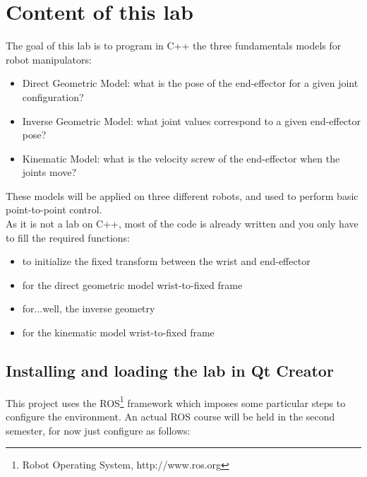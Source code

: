 \documentclass{ecnreport}
\begin{document}
  
  
  \section{Content of this lab}
  
  The goal of this lab is to program in C++ the three fundamentals models for robot manipulators:
  \begin{itemize}
    \item Direct Geometric Model: what is the pose of the end-effector for a given joint configuration?
    \item Inverse Geometric Model: what joint values correspond to a given end-effector pose?
    \item Kinematic Model: what is the velocity screw of the end-effector when the joints move?
  \end{itemize}
  These models will be applied on three different robots, and used to perform basic point-to-point control.\\
  
  As it is not a lab on C++, most of the code is already written and you only have to fill the required functions:
  \begin{itemize}
    \item {} to initialize the fixed transform between the wrist and end-effector
    \item {} for the direct geometric model wrist-to-fixed frame
    \item {} for...well, the inverse geometry
    \item {} for the kinematic model wrist-to-fixed frame
  \end{itemize}
  
  \subsection{Installing and loading the lab in Qt Creator}
  
  This project uses the ROS\footnote{Robot Operating System, http://www.ros.org} framework which imposes some particular steps to configure the environment. An actual ROS course will be held in the second semester, for now just configure as follows:
  
\end{document}
